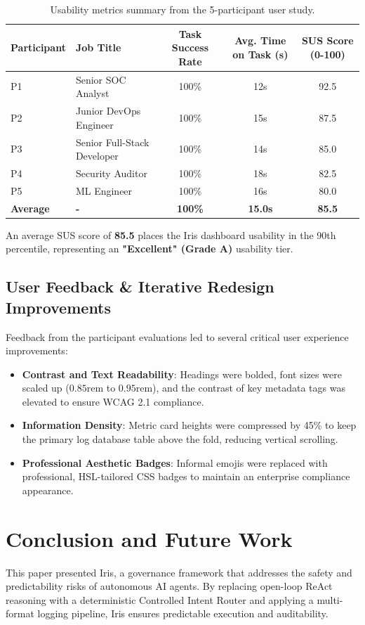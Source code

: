 \documentclass{article}
\begin{document}
\begin{table}[h!]
\centering
\begin{tabular}{llccc}
\toprule
\textbf{Participant} & \textbf{Job Title} & \textbf{Task Success Rate} & \textbf{Avg. Time on Task (s)} & \textbf{SUS Score (0-100)} \\
\midrule
P1 & Senior SOC Analyst & 100\% & 12s & 92.5 \\
P2 & Junior DevOps Engineer & 100\% & 15s & 87.5 \\
P3 & Senior Full-Stack Developer & 100\% & 14s & 85.0 \\
P4 & Security Auditor & 100\% & 18s & 82.5 \\
P5 & ML Engineer & 100\% & 16s & 80.0 \\
\midrule
\textbf{Average} & \textbf{-} & \textbf{100\%} & \textbf{15.0s} & \textbf{85.5} \\
\bottomrule
\end{tabular}
\caption{Usability metrics summary from the 5-participant user study.}
\end{table}

An average SUS score of \textbf{85.5} places the Iris dashboard usability in the 90th percentile, representing an \textbf{"Excellent" (Grade A)} usability tier.

\subsection{User Feedback \& Iterative Redesign Improvements}
Feedback from the participant evaluations led to several critical user experience improvements:
\begin{itemize}
    \item \textbf{Contrast and Text Readability}: Headings were bolded, font sizes were scaled up ($0.85\text{rem}$ to $0.95\text{rem}$), and the contrast of key metadata tags was elevated to ensure WCAG 2.1 compliance.
    \item \textbf{Information Density}: Metric card heights were compressed by 45\% to keep the primary log database table above the fold, reducing vertical scrolling.
    \item \textbf{Professional Aesthetic Badges}: Informal emojis were replaced with professional, HSL-tailored CSS badges to maintain an enterprise compliance appearance.
\end{itemize}

\section{Conclusion and Future Work}
This paper presented Iris, a governance framework that addresses the safety and predictability risks of autonomous AI agents. By replacing open-loop ReAct reasoning with a deterministic Controlled Intent Router and applying a multi-format logging pipeline, Iris ensures predictable execution and auditability.
\end{document}
